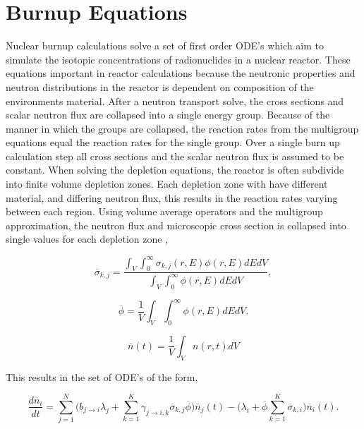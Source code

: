 \section{Burnup Equations}
Nuclear burnup calculations solve a set of first order ODE's which aim to simulate the isotopic concentrations of radionuclides in a nuclear reactor. These equations important in reactor calculations because the neutronic properties and neutron distributions in the reactor is dependent on composition of the environments material. After a neutron transport solve, the cross sections and scalar neutron flux are collapsed into a single energy group. Because of the manner in which the groups are collapsed, the reaction rates from the multigroup equations equal the reaction rates for the single group. Over a single burn up calculation step all cross sections and the scalar neutron flux is assumed to be constant. When solving the depletion equations, the reactor is often subdivide into finite volume depletion zones. Each depletion zone with have different material, and differing neutron flux, this results in the reaction rates varying between each region. Using volume average operators and the multigroup approximation, the neutron flux and microscopic cross section is collapsed into single values for each depletion zone \cite{aarnoThesis},

\begin{equation}
    \overline{\sigma}_{k,j} = \frac{\int_{V}\int_{0}^{\infty}\sigma_{k,j}(r,E)\phi(r,E) dEdV}{\int_{V}\int_{0}^{\infty}\phi(r,E) dEdV},
\end{equation}

\begin{equation}
    \overline{\phi} = \frac{1}{V}\int_{V}\int_{0}^{\infty}\phi(r,E)dEdV.
\end{equation}

\begin{equation}
    \overline{n}(t) = \frac{1}{V}\int_{V}n(r,t)dV
\end{equation}

\noindent This results in the set of ODE's of the form,

\begin{equation}
    \frac{d\overline{n}_{i}}{dt} = \sum_{j=1}^{N}\bigg(b_{j\rightarrow i}\lambda_{j} + 
    \sum_{k=1}^{K}\gamma_{j\rightarrow i,k}\overline{\sigma}_{k,j}\overline{\phi} \bigg)\overline{n}_{j}(t) - \bigg(\lambda_{i} + \overline{\phi}\sum_{k=1}^{K} \overline{\sigma}_{k,i}\bigg)\overline{n}_{i}(t).
    \label{eq:LWRDepletion}
\end{equation}


